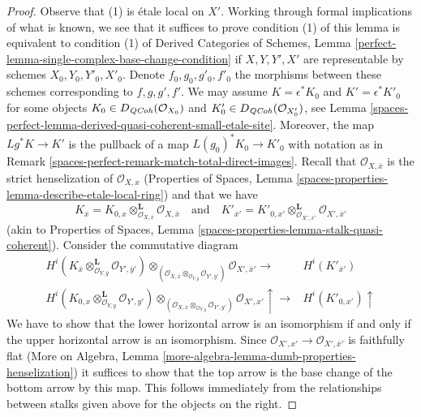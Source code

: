 \begin{proof}
Observe that (1) is \'etale local on $X'$. Working through formal
implications of what is known, we see that it suffices to prove
condition (1) of this lemma is equivalent to condition
(1) of Derived Categories of Schemes, Lemma
\ref{perfect-lemma-single-complex-base-change-condition}
if $X, Y, Y', X'$ are representable by schemes
$X_0, Y_0, Y'_0, X'_0$. Denote $f_0, g_0, g'_0, f'_0$ the
morphisms between these schemes corresponding to $f, g, g', f'$.
We may assume $K = \epsilon^*K_0$ and $K' = \epsilon^*K'_0$
for some objects $K_0 \in D_{\mathit{QCoh}}(\mathcal{O}_{X_0})$
and $K'_0 \in D_{\mathit{QCoh}}(\mathcal{O}_{X'_0})$, see
Lemma \ref{spaces-perfect-lemma-derived-quasi-coherent-small-etale-site}.
Moreover, the map $Lg^*K \to K'$ is the pullback
of a map $L(g_0)^*K_0 \to K'_0$ with notation as in
Remark \ref{spaces-perfect-remark-match-total-direct-images}.
Recall that $\mathcal{O}_{X, \overline{x}}$ is the
strict henselization of $\mathcal{O}_{X, x}$
(Properties of Spaces, Lemma
\ref{spaces-properties-lemma-describe-etale-local-ring})
and that we have
$$
K_{\overline{x}} =
K_{0, x} \otimes_{\mathcal{O}_{X, x}}^\mathbf{L} \mathcal{O}_{X, \overline{x}}
\quad\text{and}\quad
K'_{\overline{x}'} =
K'_{0, x'} \otimes_{\mathcal{O}_{X', x'}}^\mathbf{L}
\mathcal{O}_{X', \overline{x}'}
$$
(akin to Properties of Spaces, Lemma
\ref{spaces-properties-lemma-stalk-quasi-coherent}).
Consider the commutative diagram
$$
\begin{array}{cc}H^i(K_{\overline{x}}
\otimes_{\mathcal{O}_{Y, \overline{y}}}^\mathbf{L}
\mathcal{O}_{Y', \overline{y}'})
\otimes_{(\mathcal{O}_{X, \overline{x}}
\otimes_{\mathcal{O}_{Y, \overline{y}}}
\mathcal{O}_{Y', \overline{y}'})}
\mathcal{O}_{X', \overline{x}'}
\longrightarrow & H^i(K'_{\overline{x}'}) \\ H^i(K_{0, x} \otimes_{\mathcal{O}_{Y, y}}^\mathbf{L} \mathcal{O}_{Y', y'})
\otimes_{(\mathcal{O}_{X, x} \otimes_{\mathcal{O}_{Y, y}} \mathcal{O}_{Y', y'})}
\mathcal{O}_{X', x'}
\uparrow\longrightarrow & H^i(K'_{0, x'}) \uparrow\end{array}
$$
We have to show that the lower horizontal arrow is an isomorphism if and only
if the upper horizontal arrow is an isomorphism. Since
$\mathcal{O}_{X', x'} \to \mathcal{O}_{X', \overline{x}'}$
is faithfully flat (More on Algebra, Lemma
\ref{more-algebra-lemma-dumb-properties-henselization})
it suffices to show that the top arrow is the base
change of the bottom arrow by this map.
This follows immediately from the relationships between
stalks given above for the objects on the right.

\end{proof}
